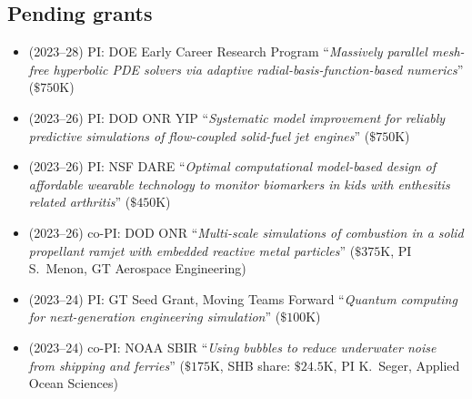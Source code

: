\subsection{Pending grants}

\begin{itemize}
    \item (2023--28) PI: DOE Early Career Research Program ``\textit{Massively parallel mesh-free hyperbolic PDE solvers via adaptive radial-basis-function-based numerics}'' ($\$750$K)
    \item (2023--26) PI: DOD ONR YIP ``\textit{Systematic model improvement for reliably predictive simulations of flow-coupled solid-fuel jet engines}'' ($\$750$K)
    \item (2023--26) PI: NSF DARE ``\textit{Optimal computational model-based design of affordable wearable technology to monitor biomarkers in kids with enthesitis related arthritis}'' ($\$450$K)
    \item (2023--26) co-PI: DOD ONR ``\textit{Multi-scale simulations of combustion in a solid propellant ramjet with embedded reactive metal particles}'' ($\$375$K, PI S.\ Menon, GT Aerospace Engineering)
    \item (2023--24) PI: GT Seed Grant, Moving Teams Forward ``\textit{Quantum computing for next-generation engineering simulation}'' ($\$100$K)
    \item (2023--24) co-PI: NOAA SBIR ``\textit{Using bubbles to reduce underwater noise from shipping and ferries}'' ($\$175$K, SHB share: $\$24.5$K, PI K.\ Seger, Applied Ocean Sciences)
\end{itemize}
